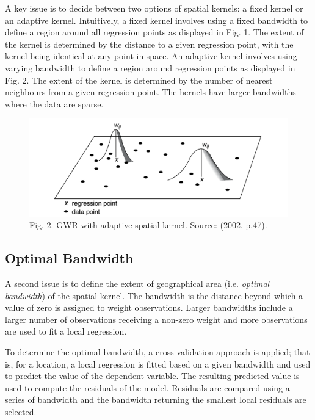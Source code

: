 \documentclass[]{book}
\begin{document}
A key issue is to decide between two options of spatial kernels: a fixed
kernel or an adaptive kernel. Intuitively, a fixed kernel involves using
a fixed bandwidth to define a region around all regression points as
displayed in Fig. 1. The extent of the kernel is determined by the
distance to a given regression point, with the kernel being identical at
any point in space. An adaptive kernel involves using varying bandwidth
to define a region around regression points as displayed in Fig. 2. The
extent of the kernel is determined by the number of nearest neighbours
from a given regression point. The hernels have larger bandwidths where
the data are sparse.

\begin{figure}
\centering
\includegraphics{figs/ch8/adaptive_bandwidth.png}
\caption{Fig. 2. GWR with adaptive spatial kernel. Source:
\citet{Fotheringham_et_al_2002_book} (2002, p.47).}
\end{figure}

\subsection{Optimal Bandwidth}\label{optimal-bandwidth}

A second issue is to define the extent of geographical area (i.e.
\emph{optimal bandwidth}) of the spatial kernel. The bandwidth is the
distance beyond which a value of zero is assigned to weight
observations. Larger bandwidths include a larger number of observations
receiving a non-zero weight and more observations are used to fit a
local regression.

To determine the optimal bandwidth, a cross-validation approach is
applied; that is, for a location, a local regression is fitted based on
a given bandwidth and used to predict the value of the dependent
variable. The resulting predicted value is used to compute the residuals
of the model. Residuals are compared using a series of bandwidth and the
bandwidth returning the smallest local residuals are selected.
\end{document}
